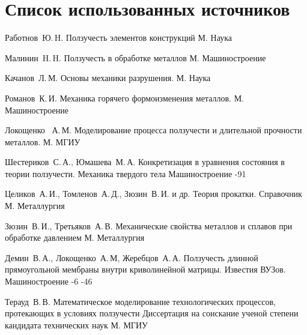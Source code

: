 \chapter*{Список использованных источников}
\renewcommand{\bibname}{Список источников}
\begin{thebibliography}{2013}

\label{rabotnov}
\by Работнов~Ю.\,H.
\book Ползучесть элементов конструкций
\publaddr М.
\publ Наука


\label{malinin}
\by Малинин~H.\,H.
\book Ползучесть в обработке металлов
\publaddr М.
\publ Машиностроение

\label{kachanov}
\by Качанов~Л.\,М.
\book Основы механики разрушения.
\publaddr М.
\publ Наука

\label{romanov}
\by Романов~К.\,И.
\book Механика горячего формоизменения металлов.
\publaddr М.
\publ Машиностроение


\label{lokoschenko}
\by Локощенко	~А.\,М.
\book Моделирование процесса ползучести и длительной прочности металлов.
\publaddr М.
\publ МГИУ

\label{shest}
\by Шестериков~С.\,А., Юмашева~М.\,А.
\paper Конкретизация в уравнения состояния в теории ползучести.
\jour Механика твердого тела
\publ Машиностроение
-91

\label{malinin_132}
\by Целиков~А.\,И., Томленов~А.\,Д., Зюзин~В.\,И. и др.
\book Теория прокатки. Справочник
\publaddr М.
\publ Металлургия

\label{malinin_136}
\by Зюзин~В.\,И., Третьяков~А.\,В. 
\book Механические свойства металлов и сплавов при обработке давлением
\publaddr М.
\publ Металлургия

\label{jerebcov}
	\by Демин~В.\,А., Локощенко~А.\,М, Жеребцов~А.\,А. 
	\paper Ползучесть длинной прямоугольной мембраны внутри криволинейной матрицы. 
	\jour Известия ВУЗов. Машиностроение
	-6
	-46

	
\label{teraud_dis}
	\by Терауд~В.\,В.
	\book Математическое моделирование технологических процессов, протекающих в условиях ползучести
	\publ Диссертация на соискание ученой степени кандидата технических наук
	\publaddr М. МГИУ


\end{thebibliography}

